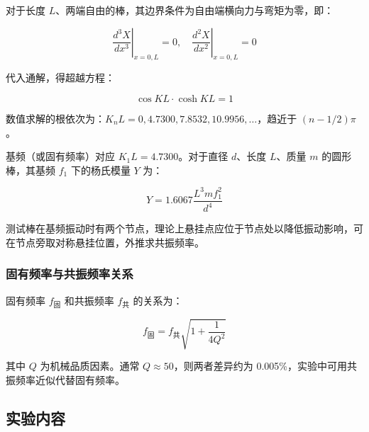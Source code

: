 \documentclass[zihao=5, UTF8]{article}
\theoremstyle{MyLineTheoremStyle} %
\theoremstyle{MyBlockTheoremStyle} %
\theoremstyle{MySubsubsectionStyle} %
\begin{document}
对于长度 \(L\)、两端自由的棒，其边界条件为自由端横向力与弯矩为零，即：

\[
\left. \frac{d^3 X}{dx^3} \right|_{x=0, L} = 0, \quad \left. \frac{d^2 X}{dx^2} \right|_{x=0, L} = 0
\]

代入通解，得超越方程：

\[
\cos KL \cdot \cosh KL = 1
\]

数值求解的根依次为：\(K_n L = 0, 4.7300, 7.8532, 10.9956, \dots\)，趋近于 \((n - 1/2) \pi\)。

基频（或固有频率）对应 \(K_1 L = 4.7300\)。对于直径 \(d\)、长度 \(L\)、质量 \(m\) 的圆形棒，其基频 \(f_1\) 下的杨氏模量 \(Y\) 为：

\[
Y = 1.6067 \frac{L^3 m f_1^2}{d^4}
\]

测试棒在基频振动时有两个节点，理论上悬挂点应位于节点处以降低振动影响，可在节点旁取对称悬挂位置，外推求共振频率。

\subsubsection*{固有频率与共振频率关系}

固有频率 \(f_\text{固}\) 和共振频率 \(f_\text{共}\) 的关系为：

\[
f_\text{固} = f_\text{共} \sqrt{1 + \frac{1}{4Q^2}}
\]

其中 \(Q\) 为机械品质因素。通常 \(Q \approx 50\)，则两者差异约为 0.005\%，实验中可用共振频率近似代替固有频率。

\subsection{实验内容}
\end{document}
